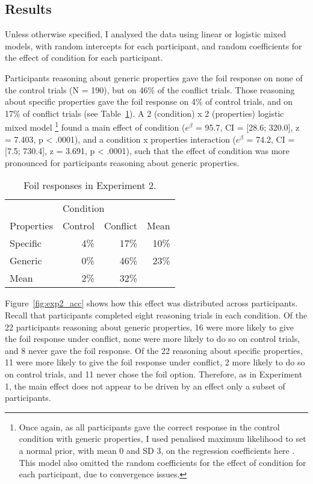 
\subsection{Results}

Unless otherwise specified,
I analysed the data using linear or logistic mixed models,
with random intercepts for each participant,
and random coefficients for the effect of condition for each participant.

Participants reasoning about generic properties
gave the foil response on
none of the control trials (N = 190),
but on 46\% of the conflict trials.
Those reasoning about specific properties
gave the foil response on 4\% of control trials,
and on 17\% of conflict trials
(see Table~\ref{tab:exp2_responses}).
A 2 (condition) x 2 (properties) logistic mixed model%
\footnote{
  Once again, as all participants gave the correct response
  in the control condition with generic properties,
  I used penalised maximum likelihood to set a normal prior,
  with mean 0 and SD 3, on the regression coefficients here \citep{Zorn2005}.
  This model also omitted the random coefficients
  for the effect of condition for each participant,
  due to convergence issues.
}
found a main effect of condition
($e^{\beta}$ = 95.7, CI = [28.6; 320.0],
z = 7.403, p < .0001),
and a condition x properties interaction
($e^{\beta}$ = 74.2, CI = [7.5; 730.4], z = 3.691, p < .0001),
such that the effect of condition was more pronounced
for participants reasoning about generic properties.

\begin{table}
  \centering
  \begin{tabular}{lrrr}
    \toprule
    \multicolumn{1}{l}{}          &
    \multicolumn{2}{l}{Condition} &
    \multicolumn{1}{l}{} \\
    \cmidrule(lr){2-4}
    Properties & Control & Conflict & Mean \\
    \midrule

    Specific   &    4\%  &    17\%  &  10\%  \\
    Generic    &    0\%  &    46\%  &  23\%   \\
    \midrule
    Mean       &    2\%  &    32\%  &        \\
    \bottomrule
  \end{tabular}
  \caption{
    Foil responses in Experiment 2.
    \label{tab:exp2_responses}
  }
\end{table}

Figure~\ref{fig:exp2_acc} shows how this effect was distributed across participants.
Recall that participants completed eight reasoning trials in each condition.
Of the 22 participants reasoning about generic properties,
16 were more likely to give the foil response under conflict,
none were more likely to do so on control trials,
and 8 never gave the foil response.
Of the 22 reasoning about specific properties,
11 were more likely to give the foil response under conflict,
2 more likely to do so on control trials,
and 11 never chose the foil option.
Therefore, as in Experiment 1, the main effect does not appear
to be driven by an effect only a subset of participants.

